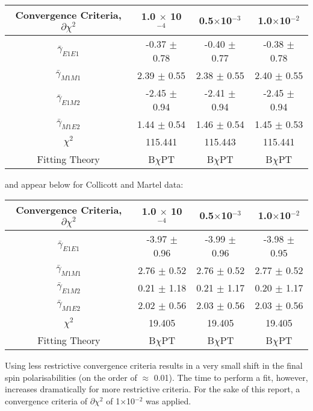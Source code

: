 \documentclass[]{article}
\begin{document}
\begin{table}[h!]
	\centering %
	\begin{tabular}{|c|c|c|c|} %
		\hline
		Convergence Criteria, $\partial\chi^{2}$ & 1.0 $\times$ 10$^{-4}$ & 0.5$\times$10$^{-3}$ & 1.0$\times$10$^{-2}$\\
		\hline %
		$\bar{\gamma}_{E1E1}$ & -0.37 $\pm$ 0.78 & -0.40 $\pm$ 0.77 & -0.38 $\pm$ 0.78 \\ 
		$\bar{\gamma}_{M1M1}$ & 2.39 $\pm$ 0.55 & 2.38 $\pm$ 0.55 & 2.40 $\pm$ 0.55 \\
		$\bar{\gamma}_{E1M2}$ & -2.45 $\pm$ 0.94 & -2.41 $\pm$ 0.94 & -2.45 $\pm$ 0.94 \\
		$\bar{\gamma}_{M1E2}$ & 1.44 $\pm$ 0.54 & 1.46 $\pm$ 0.54 & 1.45 $\pm$ 0.53 \\[0.5ex]
		$\chi^{2}$ & 115.441 & 115.443 & 115.441 \\
		\hline
		Fitting Theory & B$\chi$PT & B$\chi$PT & B$\chi$PT \\
		\hline
	\end{tabular}
\end{table}

\noindent and appear below for Collicott and Martel data:

\begin{table}[h!]
	\centering %
	\begin{tabular}{|c|c|c|c|} %
		\hline
		Convergence Criteria, $\partial\chi^{2}$ & 1.0 $\times$ 10$^{-4}$ & 0.5$\times$10$^{-3}$ & 1.0$\times$10$^{-2}$\\
		\hline %
		$\bar{\gamma}_{E1E1}$ & -3.97 $\pm$ 0.96 & -3.99 $\pm$ 0.96 & -3.98 $\pm$ 0.95 \\ 
		$\bar{\gamma}_{M1M1}$ & 2.76 $\pm$ 0.52 & 2.76 $\pm$ 0.52 & 2.77 $\pm$ 0.52 \\
		$\bar{\gamma}_{E1M2}$ & 0.21 $\pm$ 1.18 & 0.21 $\pm$ 1.17 & 0.20 $\pm$ 1.17 \\
		$\bar{\gamma}_{M1E2}$ & 2.02 $\pm$ 0.56 & 2.03 $\pm$ 0.56 & 2.03 $\pm$ 0.56 \\[0.5ex]
		$\chi^{2}$ & 19.405 & 19.405 & 19.405 \\
		\hline
		Fitting Theory & B$\chi$PT & B$\chi$PT & B$\chi$PT \\
		\hline
	\end{tabular}
\end{table}

\noindent Using less restrictive convergence criteria results in a very small shift in the final spin polarisabilities (on the order of $\approx$ 0.01). The time to perform a fit, however, increases dramatically for more restrictive criteria. For the sake of this report, a convergence criteria of $\partial\chi^{2}$ of 1$\times$10$^{-2}$ was applied.
\end{document}
